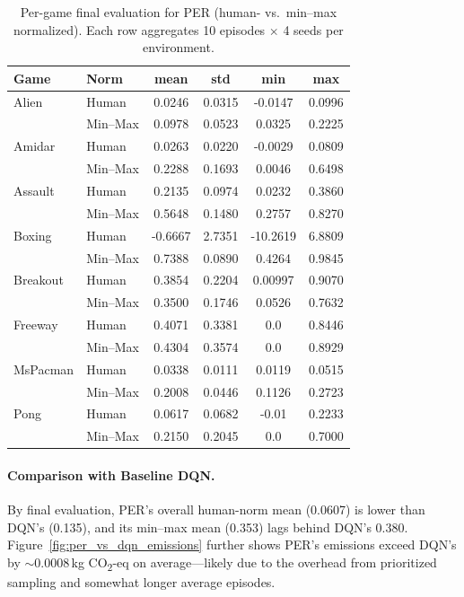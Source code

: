 \begin{table}
	\caption{Per-game final evaluation for PER (human- vs.\ min--max normalized). Each row aggregates 10 episodes $\times$ 4 seeds per environment.}
	\label{tab:per_eval_gamewise}
	\centering
	\begin{tabular}{llcccc}
		\toprule
		\textbf{Game} & \textbf{Norm} & \textbf{mean} & \textbf{std} & \textbf{min} & \textbf{max}\\
		\midrule
		Alien     & Human    & 0.0246 & 0.0315 & -0.0147 & 0.0996 \\
		& Min--Max & 0.0978 & 0.0523 & 0.0325  & 0.2225 \\
		\cmidrule{1-6}
		Amidar    & Human    & 0.0263 & 0.0220 & -0.0029 & 0.0809 \\
		& Min--Max & 0.2288 & 0.1693 & 0.0046  & 0.6498 \\
		\cmidrule{1-6}
		Assault   & Human    & 0.2135 & 0.0974 & 0.0232  & 0.3860 \\
		& Min--Max & 0.5648 & 0.1480 & 0.2757  & 0.8270 \\
		\cmidrule{1-6}
		Boxing    & Human    & -0.6667 & 2.7351 & -10.2619 & 6.8809 \\
		& Min--Max & 0.7388  & 0.0890 & 0.4264    & 0.9845 \\
		\cmidrule{1-6}
		Breakout  & Human    & 0.3854 & 0.2204 & 0.00997 & 0.9070 \\
		& Min--Max & 0.3500 & 0.1746 & 0.0526  & 0.7632 \\
		\cmidrule{1-6}
		Freeway   & Human    & 0.4071 & 0.3381 & 0.0     & 0.8446 \\
		& Min--Max & 0.4304 & 0.3574 & 0.0     & 0.8929 \\
		\cmidrule{1-6}
		MsPacman  & Human    & 0.0338 & 0.0111 & 0.0119 & 0.0515 \\
		& Min--Max & 0.2008 & 0.0446 & 0.1126 & 0.2723 \\
		\cmidrule{1-6}
		Pong      & Human    & 0.0617 & 0.0682 & -0.01 & 0.2233 \\
		& Min--Max & 0.2150 & 0.2045 & 0.0   & 0.7000 \\
		\bottomrule
	\end{tabular}
\end{table}

\paragraph{Comparison with Baseline DQN.}
By final evaluation, PER’s overall human-norm mean (0.0607) is lower than DQN’s (0.135), and its min--max mean (0.353) lags behind DQN’s 0.380.  
Figure~\ref{fig:per_vs_dqn_emissions} further shows PER’s emissions exceed DQN’s by $\sim0.0008$\,kg CO\textsubscript{2}-eq on average—likely due to the overhead from prioritized sampling and somewhat longer average episodes.

